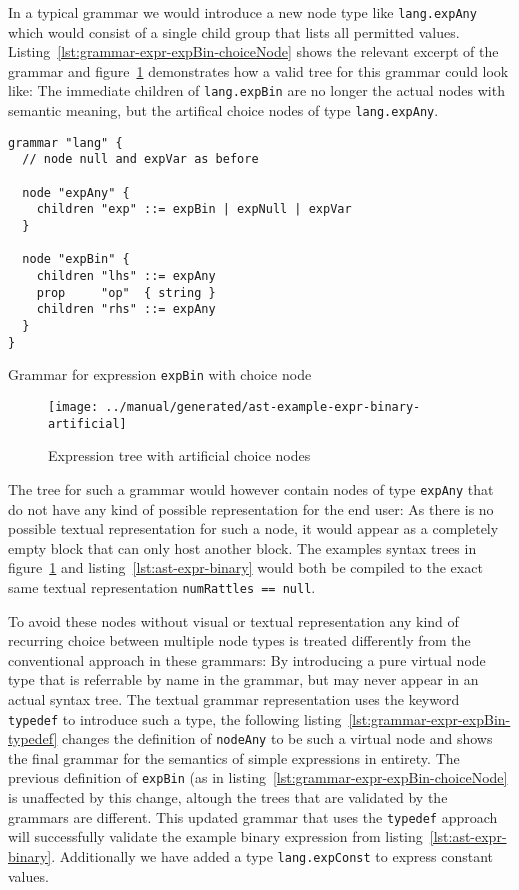 \documentclass[sigconf,review=true]{acmart}
\newcommand\astScale{0.75}
\begin{document}
In a typical grammar we would introduce a new node type like \texttt{lang.expAny} which would consist of a single child group that lists all permitted values. Listing~\ref{lst:grammar-expr-expBin-choiceNode} shows the relevant excerpt of the grammar and figure~\ref{fig:ast-choice-node} demonstrates how a valid tree for this grammar could look like: The immediate children of \texttt{lang.expBin} are no longer the actual nodes with semantic meaning, but the artifical choice nodes of type \texttt{lang.expAny}.

\begin{listing}[H]
\begin{verbatim}
grammar "lang" {
  // node null and expVar as before

  node "expAny" {
    children "exp" ::= expBin | expNull | expVar
  }

  node "expBin" {
    children "lhs" ::= expAny
    prop     "op"  { string }
    children "rhs" ::= expAny
  }
}
\end{verbatim}
\caption{Grammar for expression \texttt{expBin} with choice node}
\label{lst:grammar-expr-expBin-choiceNode}
\end{listing}

\begin{figure}
  \texttt{[image: ../manual/generated/ast-example-expr-binary-artificial]}
  \caption{Expression tree with artificial choice nodes}
  \label{fig:ast-choice-node}
\end{figure}

The tree for such a grammar would however contain nodes of type \texttt{expAny} that do not have any kind of possible representation for the end user: As there is no possible textual representation for such a node, it would appear as a completely empty block that can only host another block. The examples syntax trees in  figure~\ref{fig:ast-choice-node} and listing~\ref{lst:ast-expr-binary} would both be compiled to the exact same textual representation \texttt{numRattles == null}.

To avoid these nodes without visual or textual representation any kind of recurring choice between multiple node types is treated differently from the conventional approach in these grammars: By introducing a pure virtual node type that is referrable by name in the grammar, but may never appear in an actual syntax tree. The textual grammar representation uses the keyword \texttt{typedef} to introduce such a type, the following listing~\ref{lst:grammar-expr-expBin-typedef} changes the definition of \texttt{nodeAny} to be such a virtual node and shows the final grammar for the semantics of simple expressions in entirety. The previous definition of \texttt{expBin} (as in listing~\ref{lst:grammar-expr-expBin-choiceNode} is unaffected by this change, altough the trees that are validated by the grammars are different. This updated grammar that uses the \texttt{typedef} approach will successfully validate the example binary expression from listing~\ref{lst:ast-expr-binary}. Additionally we have added a type \texttt{lang.expConst} to express constant values.
\end{document}

